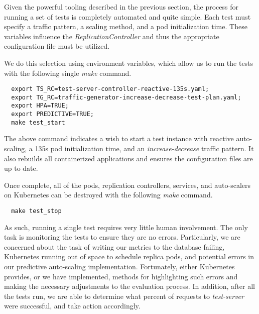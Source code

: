 Given the powerful tooling described in the previous section, the process for
running a set of tests is completely automated and quite simple. Each test
must specify a traffic pattern, a scaling method, and a pod initialization time.
These variables influence the \textit{ReplicationController} and thus the
appropriate configuration file must be utilized.

We do this selection using environment variables, which allow us to run the
tests with the following single \textit{make} command.

\begin{verbatim}
  export TS_RC=test-server-controller-reactive-135s.yaml;
  export TG_RC=traffic-generator-increase-decrease-test-plan.yaml;
  export HPA=TRUE;
  export PREDICTIVE=TRUE;
  make test_start
\end{verbatim}

The above command indicates a wish to start a test instance with reactive
auto-scaling, a 135s pod initialization time, and an
\textit{increase-decrease} traffic pattern. It also rebuilds all containerized
applications and ensures the configuration files are up to date.

Once complete, all of the pods, replication controllers, services, and
auto-scalers on Kubernetes can be destroyed with the following \textit{make}
command.

\begin{verbatim}
  make test_stop
\end{verbatim}

As such, running a single test requires very little human involvement. The only
task is monitoring the tests to ensure they are no errors. Particularly, we are
concerned about the task of writing our metrics to the database failing, Kubernetes
running out of space to schedule replica pods, and potential errors in our
predictive auto-scaling implementation. Fortunately, either Kubernetes provides,
or we have implemented, methods for highlighting such errors and making the
necessary adjustments to the evaluation process. In addition, after all the
tests run, we are able to determine what percent of requests to
\textit{test-server} were successful, and take action accordingly.
